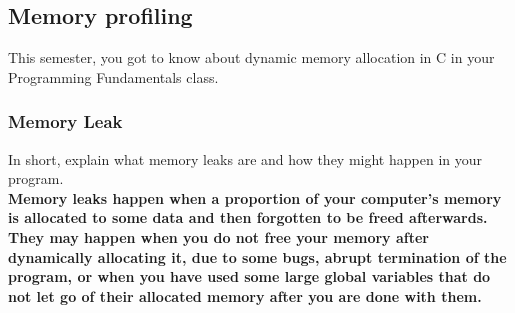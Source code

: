 \documentclass[titlepage, 12pt]{article}
\begin{document}
	\subsection{Memory profiling}
	This semester, you got to know about dynamic memory allocation in C in your Programming
	Fundamentals class.
	\subsubsection{Memory Leak}
	In short, explain what memory leaks are and how they might happen in your program.
	\\
	\textbf{Memory leaks happen when a proportion of your computer's memory is allocated to some data and then forgotten to be freed afterwards. They may happen when you do not free your memory after dynamically allocating it, due to some bugs, abrupt termination of the program, or when you have used some large global variables that do not let go of their allocated memory after you are done with them.}
\end{document}
